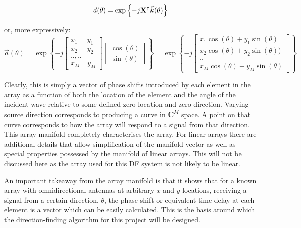 \begin{equation}
  \vec{a}(\theta) = \exp \left\{ -j \mathbf{X}^\intercal \vec{k}(\theta) \right\}
\end{equation}

or, more expressively:
\begin{equation}
\vec{a}(\theta) = \exp \left\{ -j \begin{bmatrix} x_1 & y_1 \\ x_2 & y_2 \\ .., .. \\ x_M & y_M \end{bmatrix} \begin{bmatrix} \cos(\theta) \\ \sin(\theta) \end{bmatrix} \right\}
= \exp \left\{ -j \begin{bmatrix} x_1\cos(\theta) + y_1\sin(\theta) \\ x_2\cos(\theta) + y_2\sin(\theta)) \\ .. \\ x_M\cos(\theta) + y_M\sin(\theta) \end{bmatrix} \right\}
\end{equation}

Clearly, this is simply a vector of phase shifts introduced by each element in the array as a function of both the location of the element and the angle of the incident wave relative to some defined zero location and zero direction. 
Varying source direction corresponds to producing a curve in \(\mathbf{C}^M\) space. 
A point on that curve corresponds to how the array will respond to a signal from that direction.
This array manifold completely characterises the array\cite{dacos1995estimating}. 
For linear arrays there are additional details that allow simplification of the manifold vector as well as special properties possessed by the manifold of linear arrays.
This will not be discussed here as the array used for this DF system is not likely to be linear. 

An important takeaway from the array manifold is that it shows that for a known array with omnidirectional antennas at arbitrary \(x\) and \(y\) locations, receiving a signal from a certain direction, \(\theta\), the phase shift or equivalent time delay at each element is a vector which can be easily calculated. This is the basis around which the direction-finding algorithm for this project will be designed. 

